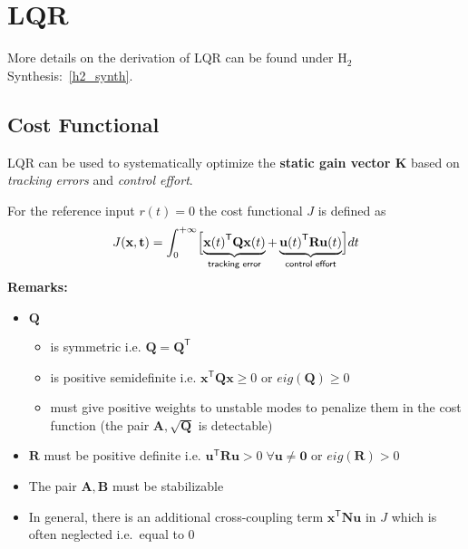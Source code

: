 \section{LQR}
More details on the derivation of LQR can be found under $\mathrm{H}_2$ Synthesis:\ \ref{h2_synth}.
\subsection{Cost Functional}
LQR can be used to systematically optimize the \textbf{static gain vector K} based on \textit{tracking errors} and \textit{control effort}.

For the reference input $r(t) = 0$ the cost functional $J$ is defined as
\noindent\begin{equation*}
    J(\mathbf{x,t})=\int_0^{+\infty} \Bigl[\underbrace{{\mathbf{x}(t)}^{\mathsf{T}}\mathbf{Qx}(t)}_{\textsf{tracking error}} + \underbrace{{\mathbf{u}(t)}^{\mathsf{T}} \mathbf{Ru}(t)}_{\textsf{control effort}} \Bigr]dt
\end{equation*}
\textbf{Remarks:}
\begin{itemize}
    \item $\mathbf{Q}$
          \begin{itemize}
              \item is symmetric i.e. $\mathbf{Q}=\mathbf{Q}^{\mathsf{T}}$
              \item is positive semidefinite i.e. $\mathbf{x}^{\mathsf{T}} \mathbf{Qx} \geq 0$ or $eig(\mathbf{Q}) \geq 0$
              \item must give positive weights to unstable modes to penalize them in the cost function (the pair $\mathbf{A}, \sqrt{\mathbf{Q}}$ is detectable)
          \end{itemize}
    \item $\mathbf{R}$ must be positive definite i.e. $\mathbf{u}^{\mathsf{T}} \mathbf{Ru} >0\; \forall \mathbf{u}\neq \mathbf{0}$ or $eig(\mathbf{R}) > 0$
    \item The pair $\mathbf{A,B}$ must be stabilizable
    \item In general, there is an additional cross-coupling term $\mathbf{x}^{\mathsf{T}}\mathbf{Nu}$ in $J$ which is often neglected i.e.\ equal to $0$
\end{itemize}

